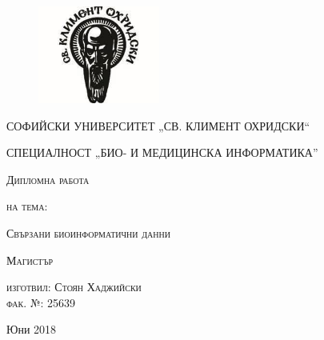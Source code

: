 \documentclass[12pt, a4paper, oneside]{book}
\begin{document}
\renewcommand{\chaptertitlename}{Глава}
\renewcommand{\contentsname}{Съдържание}
\renewcommand{\listfigurename}{Фигури}
\renewcommand{\listtablename}{Таблици}
\renewcommand{\tablename}{Таблица}
\renewcommand{\figurename}{Фиг.}

\begin{titlepage}
    \centering
	\begin{figure}
	    \centering
	    \includegraphics[width=4cm,keepaspectratio]{resources/su.jpg}\par\vspace{1cm}
	\end{figure}
	
	\vspace{1cm}
	
    \centering
    {\scshape\LARGE СОФИЙСКИ УНИВЕРСИТЕТ „СВ. КЛИМЕНТ ОХРИДСКИ“ \par}
    {\scshape\Large СПЕЦИАЛНОСТ „БИО- И МЕДИЦИНСКА ИНФОРМАТИКА” \par}
	
	\vspace{2cm}
	
	{\scshape\Large Дипломна работа \par}
	{\scshape\Large на тема: \par}
	\vspace{1cm}
	{\scshape\LARGE Свързани биоинформатични данни \par}
	{\scshape\Large Магистър \par}
	\vspace{5cm}
    {\scshape\Large изготвил: Стоян Хаджийски \\ фак. №: 25639 \par}

	\vfill

	{\large Юни 2018\par}
\end{titlepage}

\tableofcontents

\printbibliography[title={Ресурси}]

\listoffigures

\listoftables
\end{document}
